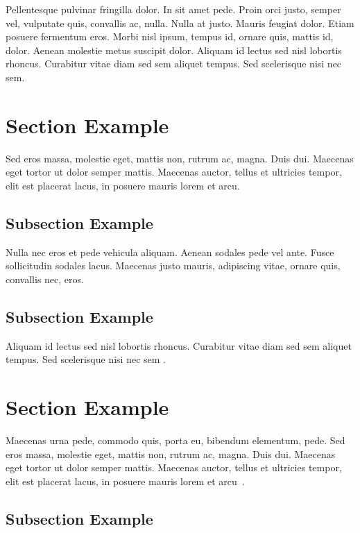 Pellentesque pulvinar fringilla dolor. In sit amet pede. 
Proin orci justo, semper vel, vulputate quis, convallis
ac, nulla. Nulla at justo. Mauris feugiat dolor. 
Etiam posuere fermentum eros. Morbi nisl ipsum, tempus id, 
ornare quis, mattis id, dolor. Aenean molestie metus 
suscipit dolor. Aliquam id lectus sed
nisl lobortis rhoncus. Curabitur vitae diam sed sem aliquet
tempus. Sed scelerisque nisi nec sem.

\section{Section Example}

Sed eros massa, molestie eget, mattis non, rutrum ac, magna. 
Duis dui. Maecenas eget tortor ut dolor semper mattis. 
Maecenas auctor, tellus et ultricies tempor, elit
est placerat lacus, in posuere mauris lorem et arcu. 

\subsection{Subsection Example}

Nulla nec eros et pede vehicula aliquam. Aenean sodales pede vel
ante. Fusce sollicitudin sodales lacus. Maecenas justo mauris,
adipiscing vitae, ornare quis, convallis nec, eros. 

\subsection{Subsection Example}

Aliquam id lectus sed nisl lobortis rhoncus. 
Curabitur vitae diam sed sem aliquet tempus. Sed scelerisque 
nisi nec sem \textcite{khakipoor_linear_2023,liu_energy_2023}.

\section{Section Example}

Maecenas urna pede, commodo quis, porta eu, bibendum elementum, 
pede. Sed eros massa, molestie eget, mattis non, rutrum ac, 
magna. Duis dui. Maecenas eget tortor ut dolor semper mattis. 
Maecenas auctor, tellus et ultricies tempor, elit est placerat 
lacus, in posuere mauris lorem et arcu~\parencite{monopoli_exploiting_2023,zhang_carma_2023,chang_adas_2023, guo_rapidstream_2023}. 

\subsection{Subsection Example}

